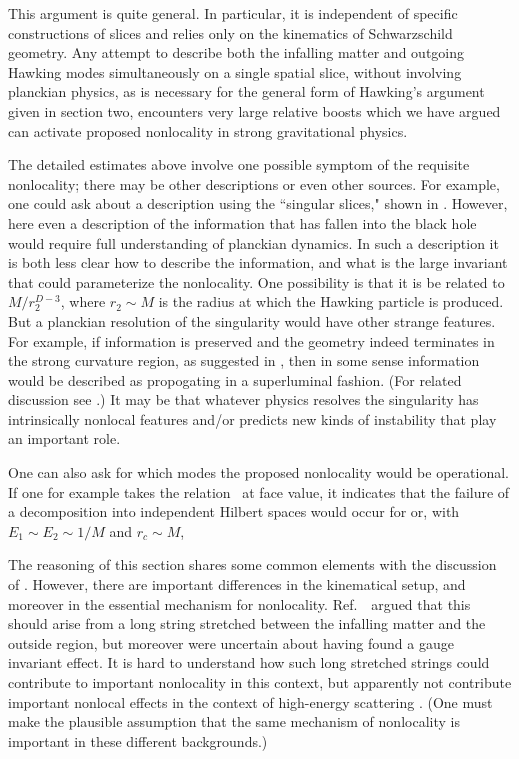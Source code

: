 This argument is quite general.  In particular, it is independent of specific constructions of slices and relies only on the kinematics of Schwarzschild geometry.  Any attempt to describe both the infalling matter and outgoing Hawking modes simultaneously on a single spatial slice, without involving planckian physics, as is necessary for the general form of Hawking's argument given in section two, encounters very large relative boosts which we have argued can activate proposed nonlocality in strong gravitational physics.

The detailed estimates above involve one possible symptom of the requisite nonlocality; there may be other descriptions or even other sources.  For example, one could ask about a description using the ``singular slices," shown in \singslice. However, here even a  description of the information that has fallen into the black hole would require full understanding of planckian dynamics.  In such a description it is both less clear how to describe the information, and what is the large invariant that could parameterize the nonlocality.   One possibility is that it is  be related to $M/r_2^{D-3}$, where $r_2\sim M$ is the radius at which the Hawking particle is produced.  But a planckian resolution of the singularity would have other strange features.  For example, if information is preserved and the geometry indeed terminates in the strong curvature region, as suggested in \singslice, then in some sense information would be described as propogating in a superluminal fashion.  (For related discussion see \BHMR.)  It may be that whatever physics resolves the singularity has intrinsically nonlocal features and/or predicts new kinds of instability that play an important role.


One can also ask for which modes the proposed nonlocality would be operational.  If one for example takes the relation \locbd\ at face value, it indicates that the failure of a decomposition into independent Hilbert spaces would occur for
%
\eqn{}
%
or, with $E_1\sim E_2\sim 1/M$ and $r_c\sim M$,
%
\eqn{}
%

The reasoning of this section shares some common elements with the discussion of \LPSTU.  However, there are important differences in the kinematical setup, and moreover in the essential mechanism for nonlocality.  Ref.~\LPSTU\ argued that this should arise from a long string stretched between the infalling matter and the outside region, but moreover were uncertain about having found a gauge invariant effect\Polchrev.  It is hard to understand how such long stretched strings could contribute to important nonlocality in this context, but apparently not contribute important nonlocal effects in the context of high-energy scattering \SGloc.  (One must make the plausible assumption that the same mechanism of nonlocality is important in these different backgrounds.)

